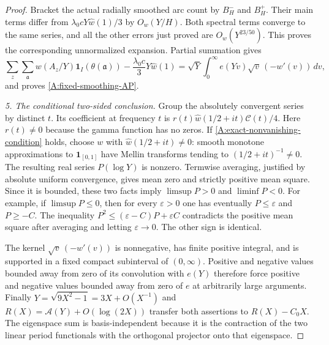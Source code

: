 \begin{proof}
Bracket the actual radially smoothed arc count by $B_H^-$ and
$B_H^+$. Their main terms differ from
$\lambda_0cY\widehat w(1)/3$ by $O_w(Y/H)$.
Both spectral terms converge to the same series, and all the
other errors just proved are $O_w(Y^{23/50})$.
This proves the corresponding unnormalized expansion.
Partial summation gives
\[
 \sum_z\sum_{\mathfrak a}w(A_z/Y)\mathbf1_I(\theta(\mathfrak a))
       -\frac{\lambda_0c}{3}Y\widehat w(1)
 =\sqrt Y\int_0^\infty e(Yv)\sqrt v\,(-w'(v))\,dv,
\]
and proves \eqref{A:fixed-smoothing-AP}.

\emph{5. The conditional two-sided conclusion.}
Group the absolutely convergent series by distinct $t$.
Its coefficient at frequency $t$ is
$r(t)\widehat w(1/2+it)\mathcal C(t)/4$.
Here $r(t)\ne0$ because the gamma function has no zeros.
If \eqref{A:exact-nonvanishing-condition} holds, choose $w$
with $\widehat w(1/2+it)\ne0$: smooth monotone approximations
to $\mathbf1_{[0,1]}$ have Mellin transforms tending to
$(1/2+it)^{-1}\ne0$.
The resulting real series $P(\log Y)$ is nonzero.
Termwise averaging, justified by absolute uniform convergence,
gives mean zero and strictly positive mean square.
Since it is bounded, these two facts imply
$\limsup P>0$ and $\liminf P<0$.
For example, if $\limsup P\leq0$, then for every $\varepsilon>0$
one has eventually $P\leq\varepsilon$ and $P\geq-C$.
The inequality
$P^2\leq(\varepsilon-C)P+\varepsilon C$ contradicts the
positive mean square after averaging and letting
$\varepsilon\to0$. The other sign is identical.

The kernel $\sqrt v\,(-w'(v))$ is nonnegative, has finite
positive integral, and is supported in a fixed compact
subinterval of $(0,\infty)$. Positive and negative values
bounded away from zero of its convolution with $e(Y)$
therefore force positive and negative values bounded away
from zero of $e$ at arbitrarily large arguments.
Finally $Y=\sqrt{9X^2-1}=3X+O(X^{-1})$ and
$R(X)=\mathcal A(Y)+O(\log(2X))$ transfer both assertions
to $R(X)-C_0X$. The eigenspace sum is basis-independent because
it is the contraction of the two linear period functionals
with the orthogonal projector onto that eigenspace.
\end{proof}
